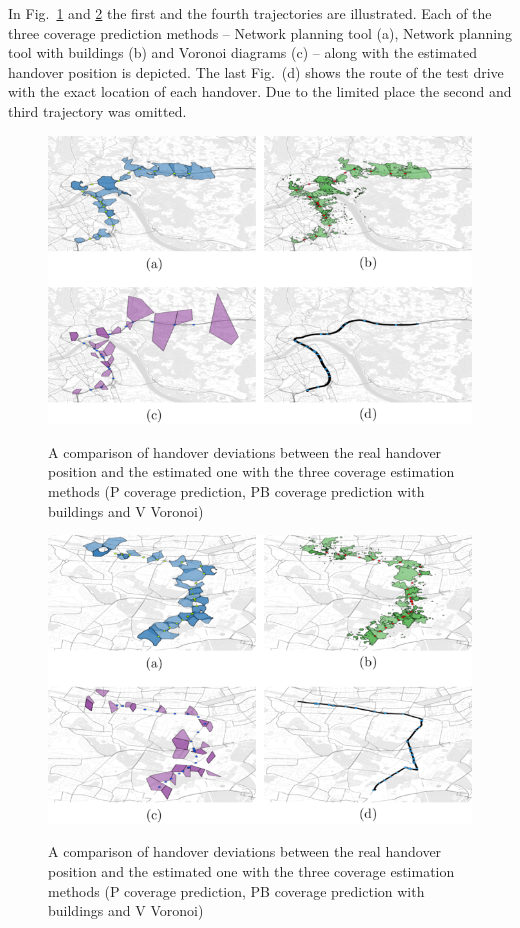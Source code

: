 In Fig.~\ref{fig:563} and \ref{fig:144} the first and the fourth trajectories are illustrated. Each of the three coverage prediction methods -- Network planning tool (a), Network planning tool with buildings (b) and Voronoi diagrams (c) -- along with the estimated handover position is depicted. The last Fig.\ (d) shows the route of the test drive with the exact location of each handover. Due to the limited place the second and third trajectory was omitted.

	\begin{figure}[h!]
	
		\caption{ A comparison of handover deviations between the real handover position and the estimated one with the three coverage estimation methods (P coverage prediction, PB coverage prediction with buildings and V Voronoi)
		}
		\includegraphics[height=0.40\textheight]{images/563standalone.png}
			\label{fig:563}
	\end{figure}
	
	
	
	\begin{figure}[h!]
		
		\caption{ A comparison of handover deviations between the real handover position and the estimated one with the three coverage estimation methods (P coverage prediction, PB coverage prediction with buildings and V Voronoi)
		}
		\includegraphics[height=0.40\textheight]{images/144standalone.png}
		\label{fig:144}
	\end{figure}

